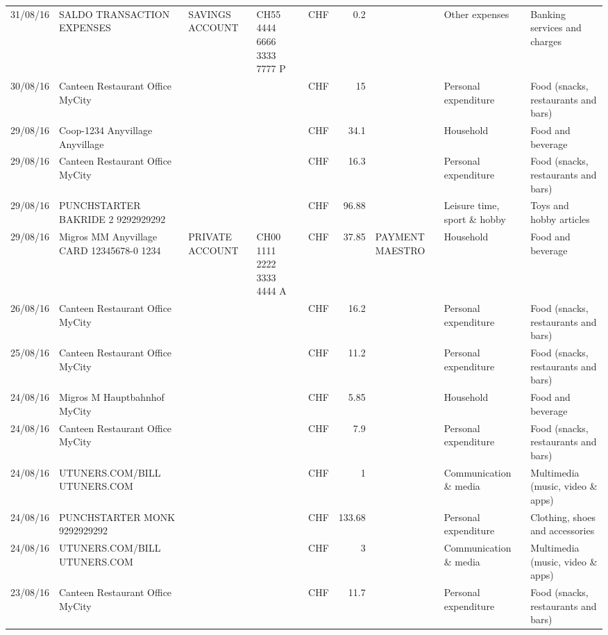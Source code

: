 \begin{landscape}
\begin{table}[h]
\begin{center}
\begin{tabular}{rllllrlll}
		31/08/16 & SALDO TRANSACTION EXPENSES & SAVINGS ACCOUNT & CH55 4444 6666 3333 7777 P & CHF   & 0.2   &       & Other expenses & Banking services and charges \\
		30/08/16 & Canteen Restaurant Office      MyCity &       &       & CHF   & 15    &       & Personal expenditure & Food (snacks, restaurants and bars) \\
		29/08/16 & Coop-1234 Anyvillage    Anyvillage &       &       & CHF   & 34.1  &       & Household & Food and beverage \\
		29/08/16 & Canteen Restaurant Office      MyCity &       &       & CHF   & 16.3  &       & Personal expenditure & Food (snacks, restaurants and bars) \\
		29/08/16 & PUNCHSTARTER BAKRIDE 2   9292929292 &       &       & CHF   & 96.88 &       & Leisure time, sport \& hobby & Toys and hobby articles \\
		29/08/16 & Migros MM Anyvillage CARD 12345678-0 1234 & PRIVATE ACCOUNT & CH00 1111 2222 3333 4444 A & CHF   & 37.85 & PAYMENT MAESTRO & Household & Food and beverage \\
		26/08/16 & Canteen Restaurant Office      MyCity &       &       & CHF   & 16.2  &       & Personal expenditure & Food (snacks, restaurants and bars) \\
		25/08/16 & Canteen Restaurant Office      MyCity &       &       & CHF   & 11.2  &       & Personal expenditure & Food (snacks, restaurants and bars) \\
		24/08/16 & Migros M Hauptbahnhof    MyCity &       &       & CHF   & 5.85  &       & Household & Food and beverage \\
		24/08/16 & Canteen Restaurant Office      MyCity &       &       & CHF   & 7.9   &       & Personal expenditure & Food (snacks, restaurants and bars) \\
		24/08/16 & UTUNERS.COM/BILL          UTUNERS.COM &       &       & CHF   & 1     &       & Communication \& media & Multimedia (music, video \& apps) \\
		24/08/16 & PUNCHSTARTER MONK   9292929292 &       &       & CHF   & 133.68 &       & Personal expenditure & Clothing, shoes and accessories \\
		24/08/16 & UTUNERS.COM/BILL          UTUNERS.COM &       &       & CHF   & 3     &       & Communication \& media & Multimedia (music, video \& apps) \\
		23/08/16 & Canteen Restaurant Office      MyCity &       &       & CHF   & 11.7  &       & Personal expenditure & Food (snacks, restaurants and bars) \\

\end{tabular}
\end{center}
\end{table}
\end{landscape}
